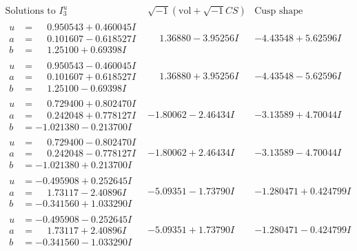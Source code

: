 \documentclass[1p]{elsarticle_modified}
\theoremstyle{definition}
\newcommand{\I}{\sqrt{-1}}
\begin{document}
$$\begin{array}{c|c|c}  
\text{Solutions to }I^u_{3}& \I (\text{vol} + \sqrt{-1}CS) & \text{Cusp shape}\\
 \hline 
\begin{aligned}
u &= \phantom{-}0.950543 + 0.460045 I \\
a &= \phantom{-}0.101607 - 0.618527 I \\
b &= \phantom{-}1.25100 + 0.69398 I\end{aligned}
 & \phantom{-}1.36880 - 3.95256 I & -4.43548 + 5.62596 I \\ \hline\begin{aligned}
u &= \phantom{-}0.950543 - 0.460045 I \\
a &= \phantom{-}0.101607 + 0.618527 I \\
b &= \phantom{-}1.25100 - 0.69398 I\end{aligned}
 & \phantom{-}1.36880 + 3.95256 I & -4.43548 - 5.62596 I \\ \hline\begin{aligned}
u &= \phantom{-}0.729400 + 0.802470 I \\
a &= \phantom{-}0.242048 + 0.778127 I \\
b &= -1.021380 - 0.213700 I\end{aligned}
 & -1.80062 - 2.46434 I & -3.13589 + 4.70044 I \\ \hline\begin{aligned}
u &= \phantom{-}0.729400 - 0.802470 I \\
a &= \phantom{-}0.242048 - 0.778127 I \\
b &= -1.021380 + 0.213700 I\end{aligned}
 & -1.80062 + 2.46434 I & -3.13589 - 4.70044 I \\ \hline\begin{aligned}
u &= -0.495908 + 0.252645 I \\
a &= \phantom{-}1.73117 - 2.40896 I \\
b &= -0.341560 + 1.033290 I\end{aligned}
 & -5.09351 - 1.73790 I & -1.280471 + 0.424799 I \\ \hline\begin{aligned}
u &= -0.495908 - 0.252645 I \\
a &= \phantom{-}1.73117 + 2.40896 I \\
b &= -0.341560 - 1.033290 I\end{aligned}
 & -5.09351 + 1.73790 I & -1.280471 - 0.424799 I \\ \hline\begin{aligned}

\end{aligned}
\end{array}$$
\end{document}
